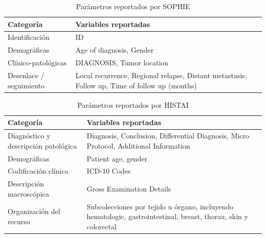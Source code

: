 \begin{table}[ht]
\centering
\caption{Parámetros reportados por SOPHIE}
\label{tab:parametros_sophie}
\renewcommand{\arraystretch}{1.2}
\begin{tabularx}{\textwidth}{lX}
\toprule
\textbf{Categoría} & \textbf{Variables reportadas} \\
\midrule
Identificación & ID \\
Demográficas & Age of diagnosis, Gender \\
Clínico-patológicas & DIAGNOSIS, Tumor location \\
Desenlace / seguimiento & Local recurrence, Regional relapse, Distant metastasis, Follow up, Time of follow up (months) \\
\bottomrule
\end{tabularx}
\end{table}

\begin{table}[ht]
\centering
\caption{Parámetros reportados por HISTAI}
\label{tab:parametros_histai}
\renewcommand{\arraystretch}{1.2}
\begin{tabularx}{\textwidth}{lX}
\toprule
\textbf{Categoría} & \textbf{Variables reportadas} \\
\midrule
Diagnóstico y descripción patológica & Diagnosis, Conclusion, Differential Diagnosis, Micro Protocol, Additional Information \\
Demográficas & Patient age, gender \\
Codificación clínica & ICD-10 Codes \\
Descripción macroscópica & Gross Examination Details \\
Organización del recurso & Subcolecciones por tejido u órgano, incluyendo hematologic, gastrointestinal, breast, thorax, skin y colorectal \\
\bottomrule
\end{tabularx}
\end{table}

\clearpage

